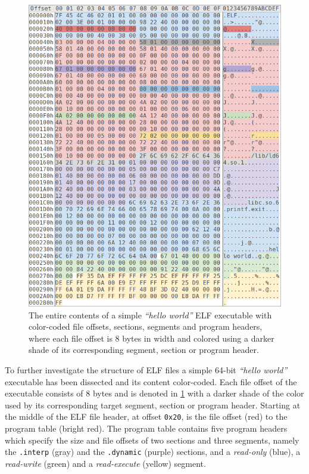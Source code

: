 \begin{figure}[htbp]
	\begin{center}
		\includegraphics[width=\textwidth]{inc/elf_dissection.png}
		\caption{The entire contents of a simple \textit{``hello world''} ELF executable with color-coded file offsets, sections, segments and program headers, where each file offset is 8 bytes in width and colored using a darker shade of its corresponding segment, section or program header.}
		\label{fig:elf_dissection}
	\end{center}
\end{figure}

To further investigate the structure of ELF files a simple 64-bit \textit{``hello world''} executable has been dissected and its content color-coded. Each file offset of the executable consists of 8 bytes and is denoted in \cref{fig:elf_dissection} with a darker shade of the color used by its corresponding target segment, section or program header. Starting at the middle of the ELF file header, at offset \texttt{0x20}, is the file offset (red) to the program table (bright red). The program table contains five program headers which specify the size and file offsets of two sections and three segments, namely the \texttt{.interp} (gray) and the \texttt{.dynamic} (purple) sections, and a \textit{read-only} (blue), a \textit{read-write} (green) and a \textit{read-execute} (yellow) segment.

